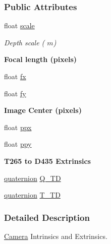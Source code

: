 \subsubsection*{Public Attributes}
\begin{DoxyCompactItemize}
\item 
float \hyperlink{structCam_a99a4c54ed1a408665a0963f308008ec8}{scale}
\begin{DoxyCompactList}\small\item\em Depth scale ( $ \textit{m}$) \end{DoxyCompactList}\end{DoxyCompactItemize}
\begin{Indent}{\bf Focal length (pixels)}\par
\begin{DoxyCompactItemize}
\item 
float \hyperlink{structCam_a7d82658b0f9a7df54516cffb6d67ac07}{fx}
\item 
float \hyperlink{structCam_a2c80b4688fa8d02ad6c645246b6ea0d4}{fy}
\end{DoxyCompactItemize}
\end{Indent}
\begin{Indent}{\bf Image Center (pixels)}\par
\begin{DoxyCompactItemize}
\item 
float \hyperlink{structCam_a0d44db9d2a2e8c416cbf9cd30b6cd6f1}{ppx}
\item 
float \hyperlink{structCam_a5af4cee2ad3b008befb9626990dfbff2}{ppy}
\end{DoxyCompactItemize}
\end{Indent}
\begin{Indent}{\bf T265 to D435 Extrinsics}\par
\begin{DoxyCompactItemize}
\item 
\hyperlink{classquaternion}{quaternion} \hyperlink{structCam_a8b6ed5501753ad64cf3e36f798fbf3cd}{Q\+\_\+\+TD}
\item 
\hyperlink{classquaternion}{quaternion} \hyperlink{structCam_a05f5a946647cd44a473b0fd03186ca96}{T\+\_\+\+TD}
\end{DoxyCompactItemize}
\end{Indent}


\subsubsection{Detailed Description}
\hyperlink{classCamera}{Camera} Intrinsics and Extrinsics. 

